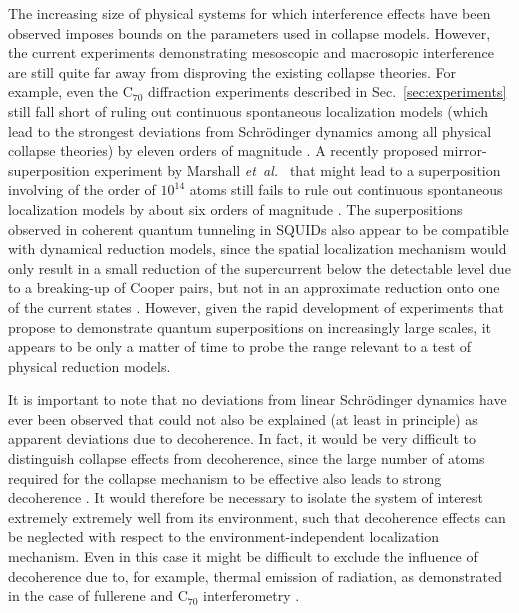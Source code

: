 \documentclass[twocolumn,aps,floatfix,amsmath,amssymb,showpacs,nofootinbib]{revtex4}
\newcommand{\etal}{\emph{et~al.\ }}
\begin{document}
The increasing size of physical systems for which interference effects
have been observed imposes bounds on the parameters used in collapse
models.  However, the current experiments demonstrating mesoscopic and
macrosopic interference are still quite far away from disproving the
existing collapse theories. For example, even the C$_{70}$
diffraction experiments described in Sec.~\ref{sec:experiments} still
fall short of ruling out continuous spontaneous localization models
\cite{Pearle:1989:cs,Diosi:1989:yb,Ghirardi:1990:lm} (which lead to
the strongest deviations from Schr\"odinger dynamics among all
physical collapse theories) by eleven orders of magnitude
\cite{Adler:2004:om}. A recently proposed mirror-superposition
experiment by Marshall \etal \cite{Marshall:2003:om} that might lead
to a superposition involving of the order of $10^{14}$ atoms still
fails to rule out continuous spontaneous localization models by about
six orders of magnitude \cite{Bassi:2005:om}. The superpositions
observed in coherent quantum tunneling in SQUIDs also appear to be
compatible with dynamical reduction models, since the spatial
localization mechanism would only result in a small reduction of the
supercurrent below the detectable level due to a breaking-up of Cooper
pairs, but not in an approximate reduction onto one of the current
states \cite{Rae:1990:wa,Buffa:1995:mo,Bassi:2003:yb}. However, given
the rapid development of experiments that propose to demonstrate
quantum superpositions on increasingly large scales, it appears to be
only a matter of time to probe the range relevant to a test of
physical reduction models.

It is important to note that no deviations from linear Schr\"odinger
dynamics have ever been observed that could not also be explained (at
least in principle) as apparent deviations due to decoherence. In
fact, it would be very difficult to distinguish collapse effects from
decoherence, since the large number of atoms required for the collapse
mechanism to be effective also leads to strong decoherence
\cite{Tegmark:1993:uz,Benatti:1995:re,Bassi:2003:yb}. It would
therefore be necessary to isolate the system of interest extremely
extremely well from its environment, such that decoherence effects can
be neglected with respect to the environment-independent localization
mechanism. Even in this case it might be difficult to exclude the
influence of decoherence due to, for example, thermal emission of
radiation, as demonstrated in the case of fullerene and C$_{70}$
interferometry \cite{Hackermuller:2004:rd,Hornberger:2005:mo}.
  
\end{document}

